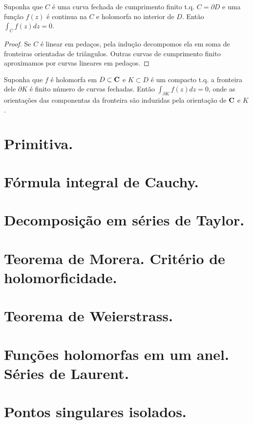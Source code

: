 \begin{teorema}
Suponha que $C$ é uma curva fechada de cumprimento finito t.q. $C = \partial D$
e uma função $f(z)$ é continua na $C$ e holomorfa no interior de $D$. Então
$\int_C f(z) dz = 0$.
\end{teorema}
\begin{proof}
Se $C$ é linear em pedaços, pela indução decompomos ela em soma de fronteiras orientadas de triângulos.
Outras curvas de cumprimento finito aproximamos por curvas lineares em pedaços.
\end{proof}

\begin{teorema}
Suponha que $f$ é holomorfa em $D\subset \mathbf{C}$ e $K \subset D$ é um compacto t.q.
a fronteira dele $\partial K$ é finito número de curvas fechadas. Então $\int_{\partial K} f(z) dz = 0$,
onde as orientações das componentas da fronteira são induzidas pela orientação de $\mathbf{C}$ e $K$.
\end{teorema}

\section{Primitiva.}


\section{Fórmula integral de Cauchy.}

\section{Decomposição em séries de Taylor.}

\section{Teorema de Morera. Critério de holomorficidade.}

\section{Teorema de Weierstrass.}

\section{Funções holomorfas em um anel. Séries de Laurent.}

\section{Pontos singulares isolados.}


